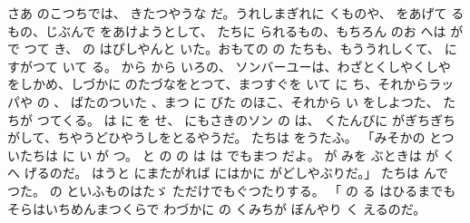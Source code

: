 \documentclass[a4paper,
tate,
book]
{jlreq}
\begin{document}
  さあ のこつちでは、 きたつやうな だ。うれしまぎれに くものや、 をあげて るもの、じぶんで をあけようとして、 たちに られるもの、もちろん のお へは が で つて き、 の はぴしやんと いた。おもての の たちも、もううれしくて、 にすがつて いて る。
   から から いろの、  ソンバーユーは、わざとくしやくしや をしかめ、しづかに のたづなをとつて、まつすぐを いて に ち、それからラッパや の 、 ばたのついた 、まつ に びた のほこ、それから い をしよつた、 たちが つてくる。 は に を せ、 にもさきのソン の は、 くたんびに がぎちぎち がして、ちやうどひやうしをとるやうだ。 たちは をうたふ。
「みそかの とついたちは
 に い が つ。
 と の の は
 は でもまつ だよ。
 が みを ぶときは
 が くへ げるのだ。
 はうと にまたがれば
にはかに がどしやぶりだ。」
   たちは んで つた。 の といふものはたゞ ただけでもぐつたりする。
「 の る はひるまでも
そらはいちめんまつくらで
わづかに の くみちが
ぼんやり く えるのだ。
\end{document}
